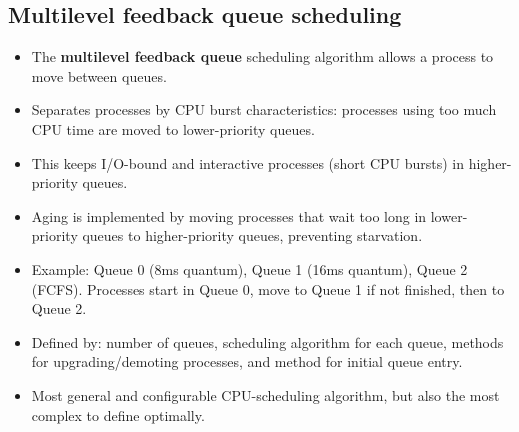 \subsection{Multilevel feedback queue scheduling}
\begin{itemize}
    \item The \textbf{multilevel feedback queue} scheduling algorithm allows a process to move between queues.
    \item Separates processes by CPU burst characteristics: processes using too much CPU time are moved to lower-priority queues.
    \item This keeps I/O-bound and interactive processes (short CPU bursts) in higher-priority queues.
    \item Aging is implemented by moving processes that wait too long in lower-priority queues to higher-priority queues, preventing starvation.
    \item Example: Queue 0 (8ms quantum), Queue 1 (16ms quantum), Queue 2 (FCFS). Processes start in Queue 0, move to Queue 1 if not finished, then to Queue 2.
    \item Defined by: number of queues, scheduling algorithm for each queue, methods for upgrading/demoting processes, and method for initial queue entry.
    \item Most general and configurable CPU-scheduling algorithm, but also the most complex to define optimally.
\end{itemize}


